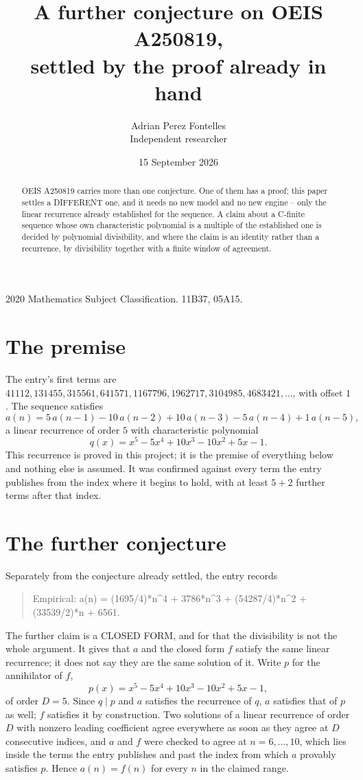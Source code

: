 \documentclass[11pt,a4paper]{article}
\title{A further conjecture on OEIS A250819,\\ \large settled by the proof already in hand}
\author{Adrian Perez Fontelles\\ \small Independent researcher}
\date{15 September 2026}
\theoremstyle{plain}
\theoremstyle{definition}
\begin{document}
\maketitle

\begin{abstract}
OEIS A250819 carries more than one conjecture. One of them has a proof; this paper settles a
DIFFERENT one, and it needs no new model and no new engine -- only the linear recurrence already
established for the sequence. A claim about a C-finite sequence whose own characteristic
polynomial is a multiple of the established one is decided by polynomial divisibility, and where
the claim is an identity rather than a recurrence, by divisibility together with a finite window
of agreement.
\end{abstract}

\noindent\small 2020 Mathematics Subject Classification. 11B37, 05A15.\normalsize

\section{The premise}

The entry's first terms are $41112, 131455, 315561, 641571, 1167796, 1962717, 3104985, 4683421,\dots$, with offset $1$. The sequence satisfies
\[
  a(n)=5\,a(n-1) - 10\,a(n-2) + 10\,a(n-3) - 5\,a(n-4) + 1\,a(n-5) ,
\]
a linear recurrence of order $5$ with characteristic polynomial
\[
  q(x)=x^{5} - 5 x^{4} + 10 x^{3} - 10 x^{2} + 5 x - 1 .
\]
This recurrence is proved in this project; it is the premise of everything below and nothing else is assumed.
It was confirmed against every term the entry publishes from the index where it begins to hold,
with at least $5+2$ further terms after that index.

\section{The further conjecture}

Separately from the conjecture already settled, the entry records

\begin{quote}\raggedright Empirical: a(n) = (1695/4)*n\^{}4 + 3786*n\^{}3 + (54287/4)*n\^{}2 + (33539/2)*n + 6561.\end{quote}

The further claim is a CLOSED FORM, and for that the divisibility is not the whole argument. It
gives that $a$ and the closed form $f$ satisfy the same linear recurrence; it does not say they
are the same solution of it. Write $p$ for the annihilator of $f$,
\[
  p(x)=x^{5} - 5 x^{4} + 10 x^{3} - 10 x^{2} + 5 x - 1 ,
\]
of order $D=5$. Since $q\mid p$ and $a$ satisfies the recurrence of $q$, $a$ satisfies that of
$p$ as well; $f$ satisfies it by construction. Two solutions of a linear recurrence of order $D$
with nonzero leading coefficient agree everywhere as soon as they agree at $D$ consecutive
indices, and $a$ and $f$ were checked to agree at $n=6,\dots,10$,
which lies inside the terms the entry publishes and past the index from which $a$ provably
satisfies $p$. Hence $a(n)=f(n)$ for every $n$ in the claimed range.
\end{document}
